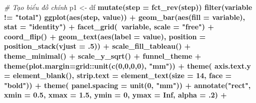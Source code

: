 \documentclass[]{krantz}
\makeatletter
\newenvironment{Shaded}{\begin{snugshade}}{\end{snugshade}}
\newcommand{\CommentTok}[1]{\textcolor[rgb]{0.37,0.37,0.37}{\textit{#1}}}
\newcommand{\DataTypeTok}[1]{\textcolor[rgb]{0.27,0.27,0.27}{#1}}
\newcommand{\DecValTok}[1]{\textcolor[rgb]{0.06,0.06,0.06}{#1}}
\newcommand{\FloatTok}[1]{\textcolor[rgb]{0.06,0.06,0.06}{#1}}
\newcommand{\KeywordTok}[1]{\textcolor[rgb]{0.27,0.27,0.27}{\textbf{#1}}}
\newcommand{\NormalTok}[1]{#1}
\newcommand{\OperatorTok}[1]{\textcolor[rgb]{0.43,0.43,0.43}{\textbf{#1}}}
\newcommand{\OtherTok}[1]{\textcolor[rgb]{0.37,0.37,0.37}{#1}}
\newcommand{\StringTok}[1]{\textcolor[rgb]{0.5,0.5,0.5}{#1}}
\newenvironment{kframe}{%
\medskip{}
\setlength{\fboxsep}{.8em}
 \def\at@end@of@kframe{}%
 \ifinner\ifhmode%
  \def\at@end@of@kframe{\end{minipage}}%
  \begin{minipage}{\columnwidth}%
 \fi\fi%
 \def\FrameCommand##1{\hskip\@totalleftmargin \hskip-\fboxsep
 \colorbox{shadecolor}{##1}\hskip-\fboxsep
     \hskip-\linewidth \hskip-\@totalleftmargin \hskip\columnwidth}%
 \MakeFramed {\advance\hsize-\width
   \@totalleftmargin\z@ \linewidth\hsize
   \@setminipage}}%
 {\par\unskip\endMakeFramed%
 \at@end@of@kframe}
\renewenvironment{Shaded}{\begin{kframe}}{\end{kframe}}
\renewenvironment{Shaded}{\begin{snugshade}}{\end{snugshade}}
\renewcommand{\CommentTok}[1]{\textcolor[rgb]{0.56,0.35,0.01}{\textit{#1}}}
\renewcommand{\DataTypeTok}[1]{\textcolor[rgb]{0.13,0.29,0.53}{#1}}
\renewcommand{\DecValTok}[1]{\textcolor[rgb]{0.00,0.00,0.81}{#1}}
\renewcommand{\FloatTok}[1]{\textcolor[rgb]{0.00,0.00,0.81}{#1}}
\renewcommand{\KeywordTok}[1]{\textcolor[rgb]{0.13,0.29,0.53}{\textbf{#1}}}
\renewcommand{\NormalTok}[1]{#1}
\renewcommand{\OperatorTok}[1]{\textcolor[rgb]{0.81,0.36,0.00}{\textbf{#1}}}
\renewcommand{\OtherTok}[1]{\textcolor[rgb]{0.56,0.35,0.01}{#1}}
\renewcommand{\StringTok}[1]{\textcolor[rgb]{0.31,0.60,0.02}{#1}}
\theoremstyle{definition}
\theoremstyle{definition}
\theoremstyle{definition}
\theoremstyle{remark}
\makeatother
\begin{document}
\begin{Shaded}
\begin{Highlighting}[]
{\CommentTok{# Tạo biểu đồ chính}
\NormalTok{p1 <-}\StringTok{ }\NormalTok{df }\OperatorTok{%
\StringTok{  }\KeywordTok{mutate}\NormalTok{(}\DataTypeTok{step =} \KeywordTok{fct_rev}\NormalTok{(step)) }\OperatorTok{%
\StringTok{  }\KeywordTok{filter}\NormalTok{(variable }\OperatorTok{!=}\StringTok{ "total"}\NormalTok{) }\OperatorTok{%
\StringTok{  }\KeywordTok{ggplot}\NormalTok{(}\KeywordTok{aes}\NormalTok{(step, value)) }\OperatorTok{+}
\StringTok{  }\KeywordTok{geom_bar}\NormalTok{(}\KeywordTok{aes}\NormalTok{(}\DataTypeTok{fill =}\NormalTok{ variable), }\DataTypeTok{stat =} \StringTok{"identity"}\NormalTok{) }\OperatorTok{+}
\StringTok{  }\KeywordTok{facet_grid}\NormalTok{(}\OperatorTok{~}\NormalTok{variable, }\DataTypeTok{scale =} \StringTok{"free"}\NormalTok{) }\OperatorTok{+}
\StringTok{  }\KeywordTok{coord_flip}\NormalTok{() }\OperatorTok{+}\StringTok{ }
\StringTok{  }\KeywordTok{geom_text}\NormalTok{(}\KeywordTok{aes}\NormalTok{(}\DataTypeTok{label =}\NormalTok{ value),}
            \DataTypeTok{position =} \KeywordTok{position_stack}\NormalTok{(}\DataTypeTok{vjust =} \FloatTok{.5}\NormalTok{)) }\OperatorTok{+}
\StringTok{  }\KeywordTok{scale_fill_tableau}\NormalTok{() }\OperatorTok{+}
\StringTok{  }\KeywordTok{theme_minimal}\NormalTok{() }\OperatorTok{+}
\StringTok{  }\KeywordTok{scale_y_sqrt}\NormalTok{() }\OperatorTok{+}
\StringTok{  }\NormalTok{funnel_theme }\OperatorTok{+}
\StringTok{  }\KeywordTok{theme}\NormalTok{(}\DataTypeTok{plot.margin=}\NormalTok{grid}\OperatorTok{::}\KeywordTok{unit}\NormalTok{(}\KeywordTok{c}\NormalTok{(}\DecValTok{0}\NormalTok{,}\DecValTok{0}\NormalTok{,}\DecValTok{0}\NormalTok{,}\DecValTok{0}\NormalTok{), }\StringTok{"mm"}\NormalTok{)) }\OperatorTok{+}
\StringTok{  }\KeywordTok{theme}\NormalTok{(}
  \DataTypeTok{axis.text.y =} \KeywordTok{element_blank}\NormalTok{(),}
  \DataTypeTok{strip.text =} \KeywordTok{element_text}\NormalTok{(}\DataTypeTok{size =} \DecValTok{14}\NormalTok{, }
                            \DataTypeTok{face =} \StringTok{"bold"}\NormalTok{)) }\OperatorTok{+}
\StringTok{  }\KeywordTok{theme}\NormalTok{(}
    \DataTypeTok{panel.spacing =} \KeywordTok{unit}\NormalTok{(}\DecValTok{0}\NormalTok{, }\StringTok{"mm"}\NormalTok{)) }\OperatorTok{+}
\StringTok{  }\KeywordTok{annotate}\NormalTok{(}\StringTok{"rect"}\NormalTok{, }\DataTypeTok{xmin =} \FloatTok{0.5}\NormalTok{, }\DataTypeTok{xmax =} \FloatTok{1.5}\NormalTok{, }\DataTypeTok{ymin =} \DecValTok{0}\NormalTok{, }\DataTypeTok{ymax =} \OtherTok{Inf}\NormalTok{,}
           \DataTypeTok{alpha =} \FloatTok{.2}\NormalTok{) }\OperatorTok{+}
}}}}
\end{Highlighting}
\end{Shaded}
\end{document}
